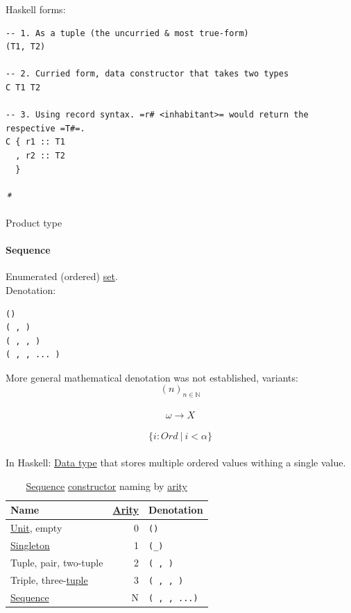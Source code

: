 \documentclass[11pt]{article}
\begin{document}
Haskell forms:\\
\begin{verbatim}
-- 1. As a tuple (the uncurried & most true-form)
(T1, T2)

-- 2. Curried form, data constructor that takes two types
C T1 T2

-- 3. Using record syntax. =r# <inhabitant>= would return the respective =T#=.
C { r1 :: T1
  , r2 :: T2
  }
\end{verbatim}

\paragraph{\emph{*}}
\label{sec:org41843a4}

\label{org04c05d6}Product type\\

\paragraph{\label{org522d1b0}Sequence}
\label{sec:orgdd5203e}
Enumerated (ordered) \hyperref[org1faf06d]{set}.\\

Denotation:\\
\begin{verbatim}
()
( , )
( , , )
( , , ... )
\end{verbatim}

More general mathematical denotation was not established, variants:\\
$$ (n)_{n \in \mathbb{N}} $$\\
$$ \omega \to X $$\\
$$ \{ i:Ord \ | \ i < \alpha \} $$\\

In Haskell: \hyperref[org212d9c3]{Data type} that stores multiple ordered values withing a single value.\\

\begin{table}[htbp]
\caption{\label{tab:sequence-names}\hyperref[org522d1b0]{Sequence} \hyperref[orgf4d811d]{constructor} naming by \hyperref[orgde25f82]{arity}}
\centering
\begin{tabular}{lrl}
Name & \hyperref[orgde25f82]{Arity} & Denotation\\
\hline
\hyperref[org0b3ee46]{Unit}, empty & 0 & \texttt{()}\\
\hyperref[org2bdbd3e]{Singleton} & 1 & \texttt{(\_)}\\
\label{orgdf7eddf}Tuple, pair, \label{orgfd41171}two-tuple & 2 & \texttt{( , )}\\
\label{org4e4ff8d}Triple, three-\hyperref[orgdf7eddf]{tuple} & 3 & \texttt{( , , )}\\
\hyperref[org522d1b0]{Sequence} & N & \texttt{( , , ...)}\\
\end{tabular}
\end{table}
\end{document}
